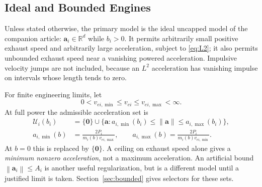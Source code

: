 \documentclass[journal,a4paper]{IEEEtran}
\newcommand{\R}{\mathbb R}
\newcommand{\U}{\mathcal U}
\newcommand{\norm}[1]{\left\|#1\right\|}
\begin{document}
\subsection{Ideal and Bounded Engines}
Unless stated otherwise, the primary model is the ideal uncapped model of the companion article: $\mathbf a_i\in\R^d$ while $b_i>0$. It permits arbitrarily small positive exhaust speed and arbitrarily large acceleration, subject to \eqref{eq:L2}; it also permits unbounded exhaust speed near a vanishing powered acceleration. Impulsive velocity jumps are not included, because an $L^2$ acceleration has vanishing impulse on intervals whose length tends to zero.

For finite engineering limits, let
\begin{equation}
 0<v_{ei,\min}\le v_{ei}\le v_{ei,\max}<\infty.
\end{equation}
At full power the admissible acceleration set is
\begin{align}
 \U_i(b_i)&=\{\mathbf0\}\cup
 \{\mathbf a:a_{i,\min}(b_i)\le\norm{\mathbf a}
                         \le a_{i,\max}(b_i)\},\label{eq:annulus}\\
 a_{i,\min}(b)&=\frac{2P_i}{m_i(b)v_{ei,\max}},\qquad
 a_{i,\max}(b)=\frac{2P_i}{m_i(b)v_{ei,\min}}.\nonumber
\end{align}
At $b=0$ this is replaced by $\{\mathbf0\}$. A ceiling on exhaust speed alone gives a \emph{minimum nonzero acceleration}, not a maximum acceleration. An artificial bound $\norm{\mathbf a_i}\le A_i$ is another useful regularization, but is a different model until a justified limit is taken. Section~\ref{sec:bounded} gives selectors for these sets.
\end{document}
